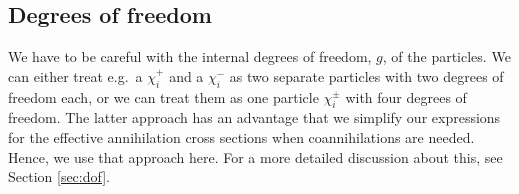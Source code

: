 \subsection{Degrees of freedom}

We have to be careful with the internal degrees of freedom, $g$, of
the particles. We can either treat e.g.\ a $\chi_i^+$ and a $\chi_i^-$ as
two separate particles with two degrees of freedom each, or we can
treat them as one particle $\chi_i^\pm$ with four degrees of
freedom. The latter approach has an advantage that we
simplify our expressions for the effective annihilation
cross sections when coannihilations are needed. Hence, we use that
approach here. For a more detailed discussion about this, see Section
\ref{sec:dof}. 
